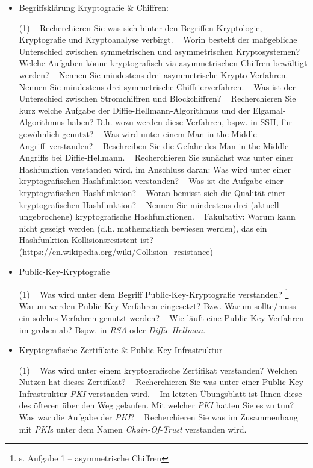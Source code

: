 \documentclass[paper=a4,fontsize=11pt]{scrartcl}%
\numberwithin{equation}{section}
\begin{document}
\begin{itemize}
	\item Begriffsklärung Kryptografie \& Chiffren:
	\begin{tasks}(1)
	\task~ Recherchieren Sie was sich hinter den Begriffen Kryptologie, Kryptografie und Kryptoanalyse verbirgt.
	\task~ Worin besteht der maßgebliche Unterschied zwischen symmetrischen und asymmetrischen Kryptosystemen?
	\task~ Welche Aufgaben könne kryptografisch via asymmetrischen Chiffren bewältigt werden?
	\task~ Nennen Sie mindestens drei asymmetrische Krypto-Verfahren.
	\task~ Nennen Sie mindestens drei symmetrische Chiffrierverfahren.
	\task~ Was ist der Unterschied zwischen Stromchiffren und Blockchiffren?
	\task~ Recherchieren Sie kurz welche Aufgabe der Diffie-Hellmann-Algorithmus und der Elgamal-Algorithmus haben? D.h. wozu werden diese Verfahren, bspw. in SSH, für gewöhnlich genutzt?
	\task~ Was wird unter einem \glqq Man-in-the-Middle-Angriff\grqq\ verstanden?
	\task~ Beschreiben Sie die Gefahr des Man-in-the-Middle-Angriffs bei Diffie-Hellmann.
	\task~ Recherchieren Sie zunächst was unter einer Hashfunktion verstanden wird, im Anschluss daran: Was wird unter einer kryptografischen Hashfunktion verstanden?
	\task~ Was ist die Aufgabe einer kryptografischen Hashfunktion?
	\task~ Woran bemisst sich die Qualität einer kryptografischen Hashfunktion?
	\task~ Nennen Sie mindestens drei (aktuell ungebrochene) kryptografische Hashfunktionen.
	\task~ Fakultativ: Warum kann nicht gezeigt werden (d.h. mathematisch bewiesen werden), das ein Hashfunktion Kollisionsresistent ist? (\url{https://en.wikipedia.org/wiki/Collision_resistance})
	\end{tasks}
	\item Public-Key-Kryptografie
	\begin{tasks}(1)
		\task~ Was wird unter dem Begriff Public-Key-Kryptografie verstanden? \footnote{s. Aufgabe 1 -- asymmetrische Chiffren}
		\task~ Warum werden Public-Key-Verfahren eingesetzt? Bzw. Warum sollte/muss ein solches Verfahren genutzt werden?
		\task~ Wie läuft eine Public-Key-Verfahren im groben ab? Bspw. in \emph{RSA} oder \emph{Diffie-Hellman}.
	\end{tasks}
	\item Kryptografische Zertifikate \& Public-Key-Infrastruktur
	\begin{tasks}(1)
		\task~ Was wird unter einem kryptografische Zertifikat verstanden? Welchen Nutzen hat dieses Zertifikat?
		\task~ Recherchieren Sie was unter einer Public-Key-Infrastruktur \emph{PKI} verstanden wird.
		\task~ Im letzten Übungsblatt ist Ihnen diese des öfteren über den Weg gelaufen. Mit welcher \emph{PKI} hatten Sie es zu tun? Was war die Aufgabe der \emph{PKI}?
		\task~ Recherchieren Sie was im Zusammenhang mit \emph{PKI}s unter dem Namen \emph{Chain-Of-Trust} verstanden wird.
	\end{tasks}
\end{itemize}
\end{document}
